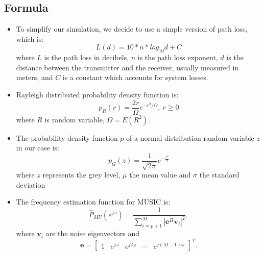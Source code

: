 \subsection{Formula}
\begin{itemize}
\item To simplify our simulation, we decide to use a simple version of path loss, which is:
\begin{equation}
L(d)=10*n*log_{10}d + C
\end{equation}
where $L$ is the path loss in decibels, $n$ is the path loss exponent, $d$ is the distance between the transmitter and the receiver, usually measured in meters, and $C$ is a constant which accounts for system losses.
\vspace{1cm}

\item Rayleigh distributed probability density function is:
\begin{equation}
p_{R}(r)={\frac {2r}{\Omega }}e^{-r^{2}/\Omega },\ r\geq {}0
\end{equation}
where $R$ is random variable, $\Omega = E(R^{2})$.
\vspace{1cm}

\item The probability density function $p$ of a normal distribution random variable $z$ in our case is:
\begin{equation}
p_{G}(z)={\frac {1}{ {\sqrt {2\pi }}}}e^{-{\frac {z^{2}}{2}}}
\end{equation}
where $z$ represents the grey level, $\mu$  the mean value and $\sigma$  the standard deviation
\vspace{1cm}
\par
\item The frequency estimation function for MUSIC is:
\begin{equation}
\hat P_{MU}(e^{j \omega}) = \frac{1}{\sum_{i=p+1}^{M} |\mathbf{e}^{H} \mathbf{v}_i|^2},
\end{equation}
where $\mathbf{v}_i$ are the noise eigenvectors and
\begin{equation}
\mathbf{e} = \begin{bmatrix}1 & e^{j \omega} & e^{j 2 \omega} & \cdots & e^{j (M-1) \omega}\end{bmatrix}^T.
\end{equation}
\end{itemize}
